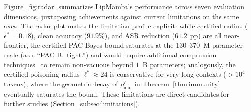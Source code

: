 \documentclass[12pt,a4paper]{article}
\theoremstyle{definition}
\theoremstyle{remark}
\newcommand{\modelname}{LipMamba}
\begin{document}
Figure~\ref{fig:radar} summarizes \modelname{}'s performance across seven evaluation dimensions, juxtaposing achievements against current limitations on the same axes. The radar plot makes the limitation profile explicit: while certified radius ($\epsilon^* = 0.18$), clean accuracy ($91.9\%$), and ASR reduction ($61.2$~pp) are all near-frontier, the certified PAC-Bayes bound saturates at the 130--370~M parameter scale (axis ``PAC-B.\ tight.'') and would require additional compression techniques~\cite{lotfi2024nonvacuous} to remain non-vacuous beyond $1$~B parameters; analogously, the certified poisoning radius $\ell^* \approx 24$ is conservative for very long contexts ($> 10^4$ tokens), where the geometric decay of $\rho_{\min}^\ell$ in Theorem~\ref{thm:immunity} eventually saturates the bound. These limitations are direct candidates for further studies (Section~\ref{subsec:limitations}).
\end{document}
